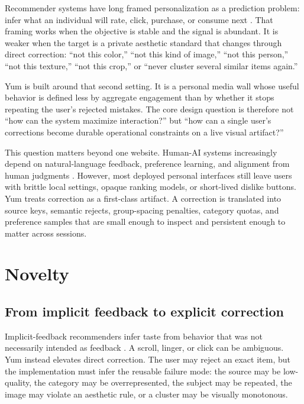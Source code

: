 \documentclass[12pt,letterpaper]{article}
\begin{document}
Recommender systems have long framed personalization as a prediction problem: infer what an individual will rate, click, purchase, or consume next \cite{resnick1997,adomavicius2005,hu2008,rendle2009}. That framing works when the objective is stable and the signal is abundant. It is weaker when the target is a private aesthetic standard that changes through direct correction: ``not this color,'' ``not this kind of image,'' ``not this person,'' ``not this texture,'' ``not this crop,'' or ``never cluster several similar items again.''

Yum is built around that second setting. It is a personal media wall whose useful behavior is defined less by aggregate engagement than by whether it stops repeating the user's rejected mistakes. The core design question is therefore not ``how can the system maximize interaction?'' but ``how can a single user's corrections become durable operational constraints on a live visual artifact?''

This question matters beyond one website. Human-AI systems increasingly depend on natural-language feedback, preference learning, and alignment from human judgments \cite{christiano2017,ouyang2022,amershi2019}. However, most deployed personal interfaces still leave users with brittle local settings, opaque ranking models, or short-lived dislike buttons. Yum treats correction as a first-class artifact. A correction is translated into source keys, semantic rejects, group-spacing penalties, category quotas, and preference samples that are small enough to inspect and persistent enough to matter across sessions.

\section{Novelty}

\subsection{From implicit feedback to explicit correction}

Implicit-feedback recommenders infer taste from behavior that was not necessarily intended as feedback \cite{hu2008,rendle2009}. A scroll, linger, or click can be ambiguous. Yum instead elevates direct correction. The user may reject an exact item, but the implementation must infer the reusable failure mode: the source may be low-quality, the category may be overrepresented, the subject may be repeated, the image may violate an aesthetic rule, or a cluster may be visually monotonous.
\end{document}
